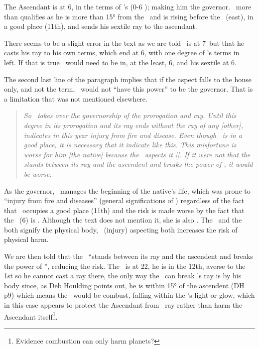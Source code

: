 The Ascendant is at 6\Scorpio, in the terms of \Mars's (0-6 \Scorpio); making him the governor. \Mars\, more than qualifies as he is more than 15° from the \Sun\, and is rising before the \Sun\, (east), in a good place (11th), and sends his sextile ray to the ascendant. 

There seems to be a slight error in the text as we are told \Mars\, is at 7\Virgo\, but that he casts his ray to his own terms, which end at 6\Scorpio, with one degree of \Mars's terms in \Scorpio\, left. If that is true \Mars\, would need to be in, at the least, 6\Virgo, and his sextile at 6\Scorpio. 

The second last line of the paragraph implies that if the aspect falls to the house only, and not the term, \Mars\, would not ``have this power'' to be the governor. That is a limitation that was not mentioned elsewhere.

\begin{quote}
\textsl{So \Mars\, takes over the governorship of the prorogation and ray. Until this degree in its prorogation and its ray ends without the ray of any [other], \Mars\, indicates in this year injury from fire and disease. Even though \Mars\, is in a good place, it is necessary that it indicate like this. This misfortune is worse for him [the native] because the \Moon\, aspects it [\Mars]. If it were not that the \Sun\, stands between its ray and the ascendent and breaks the power of \Mars, it would be worse.}
\end{quote}

As the governor, \Mars\, manages the beginning of the native's life, which was prone to ``injury from fire and diseases'' (general significations of \Mars) regardless of the fact that \Mars\, occupies a good place (11th) and the risk is made worse by the fact that the \Moon\, (6\Cancer) is \Sextile\Mars. Although the text does not mention it, she is also \Trine\ASC. The \Moon\, and the \ASC\, both signify the physical body, \Mars\, (injury) aspecting both increases the risk of physical harm.

We are then told that the \Sun\, ``stands between its ray and the ascendent and breaks the power of \Mars'', reducing the risk. The \Sun\, is at 22\Libra, he is in the 12th, averse to the 1st so he cannot cast a ray there, the only way the \Sun\, can break \Mars's ray is by his body since, as Deb Houlding points out, he is within 15° of the ascendent (DH p9) which means the \ASC\, would be combust, falling within the \Sun's light or glow, which in this case appears to protect the Ascendant from \Mars\, ray rather than harm the Ascendant itself\footnote{Evidence combustion can only harm planets?}.

